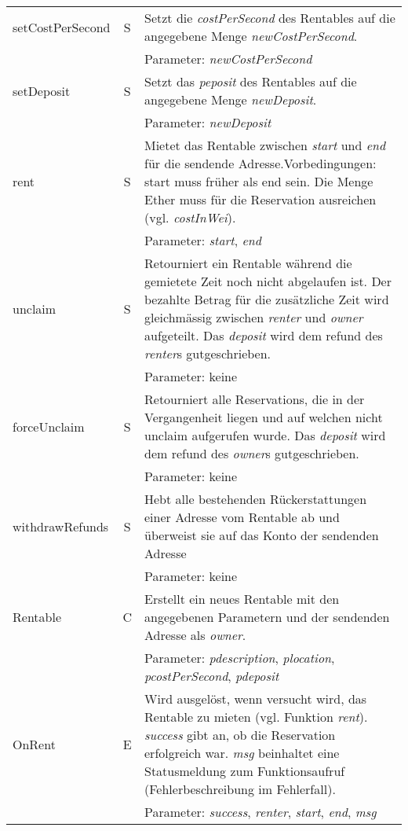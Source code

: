 \begin{longtable}{@{}lcL{9cm}@{}}
setCostPerSecond   & S   & Setzt die \emph{costPerSecond} des Rentables auf die angegebene Menge \emph{newCostPerSecond}.\\ & & Parameter: \emph{newCostPerSecond} \\\midrule
setDeposit   & S   & Setzt das \emph{peposit} des Rentables auf die angegebene Menge \emph{newDeposit}.\\ & & Parameter: \emph{newDeposit} \\\midrule
rent                & S   & Mietet das Rentable zwischen \emph{start} und \emph{end} für die sendende Adresse.\newline{}Vorbedingungen: start muss früher als end sein. Die Menge Ether muss für die Reservation ausreichen (vgl. \emph{costInWei}). \\ & & Parameter: \emph{start}, \emph{end} \\\midrule
unclaim         & S   & Retourniert ein Rentable während die gemietete Zeit noch nicht abgelaufen ist. Der bezahlte Betrag für die zusätzliche Zeit wird gleichmässig zwischen \emph{renter} und \emph{owner} aufgeteilt. Das \emph{deposit} wird dem refund des \emph{renter}s gutgeschrieben.\\ & & Parameter: keine \\\midrule
forceUnclaim         & S   & Retourniert alle Reservations, die in der Vergangenheit liegen und auf welchen nicht unclaim aufgerufen wurde. Das \emph{deposit} wird dem refund des \emph{owner}s gutgeschrieben.\\ & & Parameter: keine \\\midrule
withdrawRefunds     & S   & Hebt alle bestehenden Rückerstattungen einer Adresse vom Rentable ab und überweist sie auf das Konto der sendenden Adresse\\ & & Parameter: keine \\\midrule
Rentable            & C   & Erstellt ein neues Rentable mit den angegebenen Parametern und der sendenden Adresse als \emph{owner}.\\ & & Parameter: \emph{pdescription}, \emph{plocation}, \emph{pcostPerSecond}, \emph{pdeposit} \\ \midrule
OnRent              & E   & Wird ausgelöst, wenn versucht wird, das Rentable zu mieten (vgl. Funktion \emph{rent}). \emph{success} gibt an, ob die Reservation erfolgreich war. \emph{msg} beinhaltet eine Statusmeldung zum Funktionsaufruf (Fehlerbeschreibung im Fehlerfall).\\ & & Parameter: \emph{success}, \emph{renter}, \emph{start}, \emph{end}, \emph{msg} \\ \midrule

\end{longtable}
